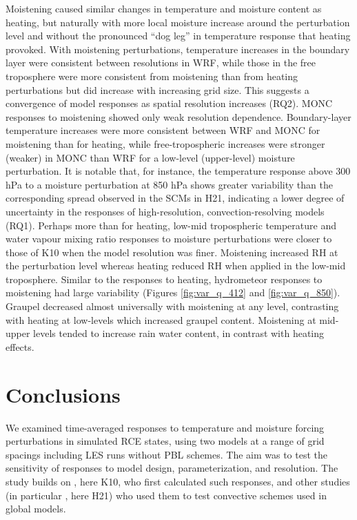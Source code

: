 \documentclass[draft]{agujournal2019}
\begin{document}
Moistening caused similar changes in temperature and moisture content as
heating, but naturally with more local moisture increase around the perturbation
level and without the pronounced ``dog leg'' in temperature response that
heating provoked. With moistening perturbations, temperature increases in the
boundary layer were consistent between resolutions in WRF, while those in the
free troposphere were more consistent from moistening than from heating
perturbations but did increase with increasing grid size. This suggests a
convergence of model responses as spatial resolution increases (RQ2). MONC
responses to moistening showed only weak resolution dependence. Boundary-layer
temperature increases were more consistent between WRF and MONC for moistening
than for heating, while free-tropospheric increases were stronger (weaker) in
MONC than WRF for a low-level (upper-level) moisture perturbation. It is notable
that, for instance, the temperature response above 300 hPa to a moisture
perturbation at 850 hPa shows greater variability than the corresponding spread
observed in the SCMs in H21, indicating a lower degree of uncertainty in the
responses of high-resolution, convection-resolving models (RQ1). Perhaps more
than for heating, low-mid tropospheric temperature and water vapour mixing ratio
responses to moisture perturbations were closer to those of K10 when the model
resolution was finer. Moistening increased RH at the perturbation level whereas
heating reduced RH when applied in the low-mid troposphere. Similar to the
responses to heating, hydrometeor responses to moistening had large variability
(Figures \ref{fig:var_q_412} and \ref{fig:var_q_850}). Graupel decreased almost
universally with moistening at any level, contrasting with heating at low-levels
which increased graupel content. Moistening at mid-upper levels tended to
increase rain water content, in contrast with heating effects.

\section{Conclusions}
\label{sec:conclusions}

We examined time-averaged responses to temperature and moisture forcing
perturbations in simulated RCE states, using two models at a range of grid
spacings including LES runs without PBL schemes. The aim was to test the
sensitivity of responses to model design, parameterization, and resolution. The
study builds on , here K10, who first calculated such
responses, and other studies (in particular , here H21)
who used them to test convective schemes used in global models.
\end{document}
